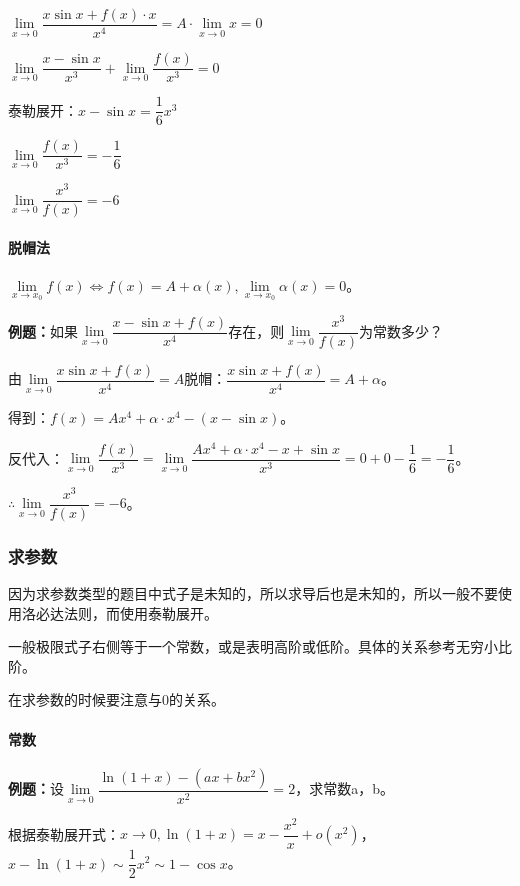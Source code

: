 \documentclass[UTF8, 12pt]{ctexart}
\begin{document}
$\lim\limits_{x\to 0}\dfrac{x\sin x+f(x)\cdot x}{x^4}=A\cdot\lim\limits_{x\to 0}x=0$

$\lim\limits_{x\to 0}\dfrac{x-\sin x}{x^3}+\lim\limits_{x\to 0}\dfrac{f(x)}{x^3}=0$

$\text{泰勒展开：}x-\sin x=\dfrac{1}{6}x^3$

$\lim\limits_{x\to 0}\dfrac{f(x)}{x^3}=-\dfrac{1}{6}$

$\lim\limits_{x\to 0}\dfrac{x^3}{f(x)}=-6$

\paragraph{脱帽法} \leavevmode \medskip

$\lim\limits_{x\to x_0}f(x)\Leftrightarrow f(x)=A+\alpha(x),\lim\limits_{x\to x_0}\alpha(x)=0$。

\textbf{例题：}如果$\lim\limits_{x\to 0}\dfrac{x-\sin x+f(x)}{x^4}$存在，则$\lim\limits_{x\to 0}\dfrac{x^3}{f(x)}$为常数多少？

由$\lim\limits_{x\to 0}\dfrac{x\sin x+f(x)}{x^4}=A$脱帽：$\dfrac{x\sin x+f(x)}{x^4}=A+\alpha$。

得到：$f(x)=Ax^4+\alpha\cdot x^4-(x-\sin x)$。

反代入：$\lim\limits_{x\to 0}\dfrac{f(x)}{x^3}=\lim\limits_{x\to 0}\dfrac{Ax^4+\alpha\cdot x^4-x+\sin x}{x^3}=0+0-\dfrac{1}{6}=-\dfrac{1}{6}$。

$\therefore \lim\limits_{x\to 0}\dfrac{x^3}{f(x)}=-6$。

\subsubsection{求参数}

因为求参数类型的题目中式子是未知的，所以求导后也是未知的，所以一般不要使用洛必达法则，而使用泰勒展开。

一般极限式子右侧等于一个常数，或是表明高阶或低阶。具体的关系参考无穷小比阶。

在求参数的时候要注意与0的关系。

\paragraph{常数} \leavevmode \medskip

\textbf{例题：}设$\lim\limits_{x\to 0}\dfrac{\ln(1+x)-(ax+bx^2)}{x^2}=2$，求常数a，b。

根据泰勒展开式：$x\to 0,\ln(1+x)=x-\dfrac{x^2}{x}+o(x^2)$，$x-\ln(1+x)\sim\dfrac{1}{2}x^2\sim 1-\cos x$。
\end{document}
